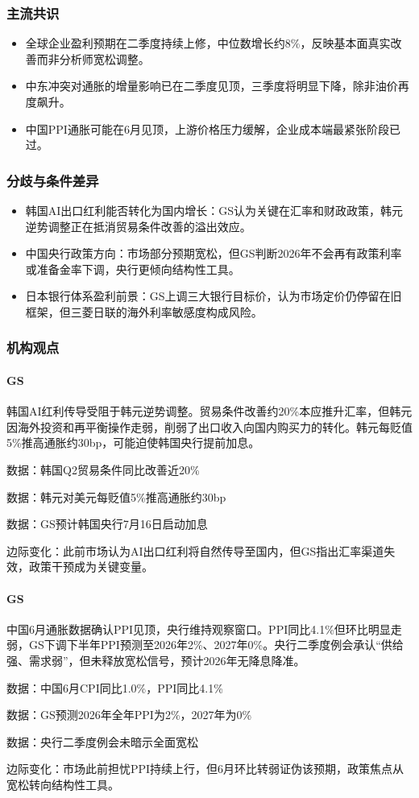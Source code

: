 \documentclass[11pt]{ctexart}
\begin{document}
\subsubsection*{主流共识}
\begin{itemize}
  \item 全球企业盈利预期在二季度持续上修，中位数增长约8\%，反映基本面真实改善而非分析师宽松调整。
  \item 中东冲突对通胀的增量影响已在二季度见顶，三季度将明显下降，除非油价再度飙升。
  \item 中国PPI通胀可能在6月见顶，上游价格压力缓解，企业成本端最紧张阶段已过。
\end{itemize}
\subsubsection*{分歧与条件差异}
\begin{itemize}
  \item 韩国AI出口红利能否转化为国内增长：GS认为关键在汇率和财政政策，韩元逆势调整正在抵消贸易条件改善的溢出效应。
  \item 中国央行政策方向：市场部分预期宽松，但GS判断2026年不会再有政策利率或准备金率下调，央行更倾向结构性工具。
  \item 日本银行体系盈利前景：GS上调三大银行目标价，认为市场定价仍停留在旧框架，但三菱日联的海外利率敏感度构成风险。
\end{itemize}
\subsubsection*{机构观点}
\paragraph{GS} 韩国AI红利传导受阻于韩元逆势调整。贸易条件改善约20\%本应推升汇率，但韩元因海外投资和再平衡操作走弱，削弱了出口收入向国内购买力的转化。韩元每贬值5\%推高通胀约30bp，可能迫使韩国央行提前加息。
{\small\color{refgray}数据：韩国Q2贸易条件同比改善近20\%\par}
{\small\color{refgray}数据：韩元对美元每贬值5\%推高通胀约30bp\par}
{\small\color{refgray}数据：GS预计韩国央行7月16日启动加息\par}
{\small\color{refgray}边际变化：此前市场认为AI出口红利将自然传导至国内，但GS指出汇率渠道失效，政策干预成为关键变量。\par}
\paragraph{GS} 中国6月通胀数据确认PPI见顶，央行维持观察窗口。PPI同比4.1\%但环比明显走弱，GS下调下半年PPI预测至2026年2\%、2027年0\%。央行二季度例会承认“供给强、需求弱”，但未释放宽松信号，预计2026年无降息降准。
{\small\color{refgray}数据：中国6月CPI同比1.0\%，PPI同比4.1\%\par}
{\small\color{refgray}数据：GS预测2026年全年PPI为2\%，2027年为0\%\par}
{\small\color{refgray}数据：央行二季度例会未暗示全面宽松\par}
{\small\color{refgray}边际变化：市场此前担忧PPI持续上行，但6月环比转弱证伪该预期，政策焦点从宽松转向结构性工具。\par}
\end{document}
